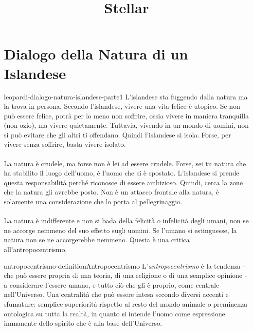 \documentclass[preview]{standalone}
\begin{document}
\title{Stellar}
\genpage

\section{Dialogo della Natura di un Islandese}


\begin{snippet}{leopardi-dialogo-natura-islandese-parte1}
    L'islandese sta fuggendo dalla natura ma la trova in persona.
    Secondo l'islandese, vivere una vita felice è utopico.
    Se non può essere felice, potrà per lo meno non soffrire,
    ossia vivere in maniera tranquilla (non ozio), ma vivere quietamente.
    Tuttavia, vivendo in un mondo di uomini, non si può evitare 
    che gli altri ti offendano.
    Quindi l'islandese si isola.
    Forse, per vivere senza soffrire, basta vivere isolato.
    \\\\
    La natura è crudele, ma forse non è lei ad essere crudele.
    Forse, sei tu natura che ha stabilito il luogo dell'uomo,
    è l'uomo che si è spostato. L'islandese si prende questa responsabilità perché
    riconosce di essere ambizioso. Quindi, cerca la zone che la natura gli avrebbe posto.
    Non è un attacco frontale alla natura, è solamente una considerazione
    che lo porta al pellegrinaggio.
    \\\\
    La natura è indifferente e non si bada della felicità o infelicità
    degli umani, non se ne accorge nemmeno del suo effetto sugli uomini.
    Se l'umano si estinguesse, la natura non se ne accorgerebbe nemmeno.
    Questa è una critica all'antropocentrismo.
\end{snippet}

\begin{snippetdefinition}{antropocentrismo-definition}{Antropocentrismo}
    L'\textit{antropocentrismo} è la tendenza -
    che può essere propria di una teoria, di una religione o di una semplice opinione -
    a considerare l'essere umano, e tutto ciò che gli è proprio,
    come centrale nell'Universo.
    Una centralità che può essere intesa secondo diversi accenti e sfumature:
    semplice superiorità rispetto al resto del mondo animale o preminenza ontologica su
    tutta la realtà, in quanto si intende l'uomo come espressione immanente
    dello spirito che è alla base dell'Universo. 
\end{snippetdefinition}
\end{document}

